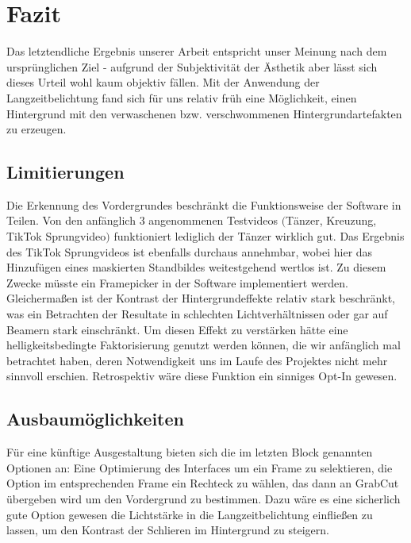 \documentclass[12pt]{scrartcl}
\begin{document}





\section{Fazit}
Das letztendliche Ergebnis unserer Arbeit entspricht unser Meinung nach dem urspr\"unglichen Ziel - aufgrund der Subjektivit\"at der
\"Asthetik aber l\"asst sich dieses Urteil wohl kaum objektiv f\"allen. Mit der Anwendung der Langzeitbelichtung fand sich f\"ur uns relativ
fr\"uh eine M\"oglichkeit, einen Hintergrund mit den verwaschenen bzw. verschwommenen Hintergrundartefakten zu erzeugen.
\subsection{Limitierungen}
Die Erkennung des Vordergrundes beschr\"ankt die Funktionsweise der Software in Teilen. Von den anf\"anglich 3 angenommenen Testvideos
$ ( $T\"anzer, Kreuzung, TikTok Sprungvideo$ ) $ funktioniert lediglich der T\"anzer wirklich gut. Das Ergebnis des TikTok Sprungvideos ist
ebenfalls durchaus annehmbar, wobei hier das Hinzuf\"ugen eines maskierten Standbildes weitestgehend wertlos ist. Zu diesem Zwecke m\"usste ein Framepicker in der Software implementiert werden. Gleicherma{\ss}en ist der Kontrast der Hintergrundeffekte relativ stark beschr\"ankt, was ein Betrachten der Resultate in schlechten Lichtverh\"altnissen oder gar auf Beamern stark einschr\"ankt. Um diesen Effekt zu verst\"arken h\"atte eine helligkeitsbedingte Faktorisierung genutzt werden k\"onnen, die wir anf\"anglich mal betrachtet haben, deren Notwendigkeit uns im Laufe des Projektes nicht mehr sinnvoll erschien. Retrospektiv w\"are diese Funktion ein sinniges Opt-In gewesen.
\subsection{Ausbaum\"oglichkeiten}
F\"ur eine k\"unftige Ausgestaltung bieten sich die im letzten Block genannten Optionen an: Eine Optimierung des Interfaces um ein Frame zu selektieren, die Option im entsprechenden Frame ein Rechteck zu w\"ahlen, das dann an GrabCut \"ubergeben wird um den Vordergrund zu bestimmen. Dazu w\"are es eine sicherlich gute Option gewesen die Lichtst\"arke in die Langzeitbelichtung einflie{\ss}en zu lassen, um den Kontrast der Schlieren im Hintergrund zu steigern.
\end{document}
